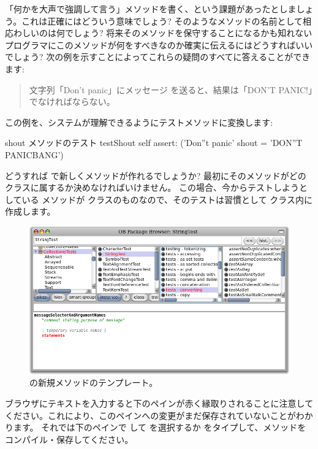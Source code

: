 \documentclass[a4paper,10pt,twoside]{book}
\begin{document}
「何かを大声で強調して言う」メソッドを書く、という課題があったとしましょう。これは正確にはどういう意味でしょう? そのようなメソッドの名前として相応わしいのは何でしょう? 将来そのメソッドを保守することになるかも知れないプログラマにこのメソッドが何をすべきなのか確実に伝えるにはどうすればいいでしょう? 次の例を示すことによってこれらの疑問のすべてに答えることができます:

\begin{quote}
文字列「Don't panic」にメッセージ  を送ると、結果は「DON'T PANIC!」でなければならない。
\end{quote}

\noindent
この例を、システムが理解できるようにテストメソッドに変換します:

\begin{method}[testShout]{shout メソッドのテスト}
testShout
	self assert: ('Don''t panic' shout = 'DON''T PANICBANG')
\end{method} %

どうすれば \pharo で新しくメソッドが作れるでしょうか? 最初にそのメソッドがどのクラスに属するか決めなければいけません。
この場合、今からテストしようとしている  メソッドが  クラスのものなので、そのテストは習慣として  クラス内に作成します。

\begin{figure}[hbt]
\centerline {\includegraphics[width=\textwidth]{StringTest-newMethodTemplate}}
\caption{ の新規メソッドのテンプレート。
}
\end{figure}

ブラウザにテキストを入力すると下のペインが赤く縁取りされることに注意してください。これにより、このペインへの変更がまだ保存されていないことがわかります。
それでは下のペインで \actclick して  を選択するか  をタイプして、メソッドをコンパイル・保存してください。
\end{document}
